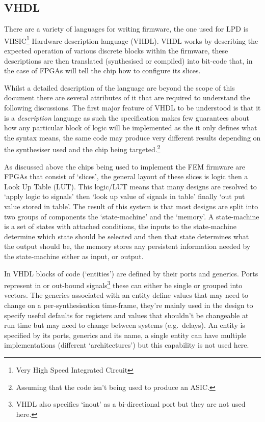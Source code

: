 \subsection{VHDL} %
\label{sub:vhdl}
There are a variety of languages for writing firmware, the one used for LPD is VHSIC\footnote{Very High Speed Integrated Circuit} Hardware description language (VHDL). VHDL works by describing the expected operation of various discrete blocks within the firmware, these descriptions are then translated (synthesised or compiled) into bit-code that, in the case of FPGAs will tell the chip how to configure its slices.

Whilst a detailed description of the language are beyond the scope of this document there are several attributes of it that are required to understand the following discussions. The first major feature of VHDL to be understood is that it is a \emph{description} language as such the specification makes few guarantees about how any particular block of logic will be implemented as the it only defines what the syntax means, the same code may produce very different results depending on the synthesiser used and the chip being targeted.\footnote{Assuming that the code isn't being used to produce an ASIC.}

As discussed above the chips being used to implement the FEM firmware are FPGAs that consist of `slices', the general layout of these slices is logic then a Look Up Table (LUT). This logic/LUT means that many designs are resolved to `apply logic to signals' then `look up value of signals in table' finally `out put value stored in table'. The result of this system is that most designs are split into two groups of components the `state-machine' and the `memory'. A state-machine is a set of states with attached conditions, the inputs to the state-machine determine which state should be selected and then that state determines what the output should be, the memory stores any persistent information needed by the state-machine either as input, or output.

In VHDL blocks of code (`entities') are defined by their ports and generics. Ports represent in or out-bound signals\footnote{VHDL also specifies `inout' as a bi-directional port but they are not used here.} these can either be single or grouped into vectors. The generics associated with an entity define values that may need to change on a per-synthesisation time-frame, they're mainly used in the design to specify useful defaults for registers and values that shouldn't be changeable at run time but may need to change between systems (e.g.\ delays). An entity is specified by its ports, generics and its name, a single entity can have multiple implementations (different `architectures') but this capability is not used here.

